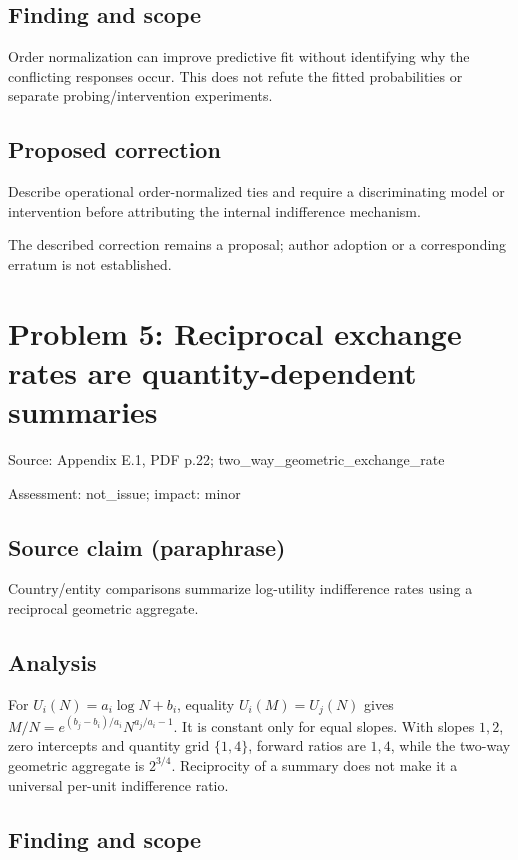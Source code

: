 \documentclass[11pt]{article}
\begin{document}
\subsection*{Finding and scope}

Order normalization can improve predictive fit without identifying why the conflicting responses occur. This does not refute the fitted probabilities or separate probing/intervention experiments.

\subsection*{Proposed correction}

Describe operational order-normalized ties and require a discriminating model or intervention before attributing the internal indifference mechanism.

The described correction remains a proposal; author adoption or a corresponding erratum is not established.

\section*{Problem 5: Reciprocal exchange rates are quantity-dependent summaries}

Source: Appendix E.1, PDF p.22; two\_way\_geometric\_exchange\_rate

Assessment: not\_issue; impact: minor

\subsection*{Source claim (paraphrase)}

Country/entity comparisons summarize log-utility indifference rates using a reciprocal geometric aggregate.

\subsection*{Analysis}

For \(U_i(N)=a_i\log N+b_i\), equality \(U_i(M)=U_j(N)\) gives \(M/N=e^{(b_j-b_i)/a_i}N^{a_j/a_i-1}\). It is constant only for equal slopes. With slopes \(1,2\), zero intercepts and quantity grid \(\{1,4\}\), forward ratios are \(1,4\), while the two-way geometric aggregate is \(2^{3/4}\). Reciprocity of a summary does not make it a universal per-unit indifference ratio.

\subsection*{Finding and scope}
\end{document}
